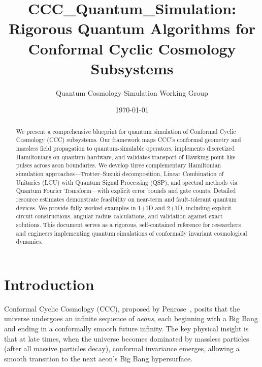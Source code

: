 \documentclass[11pt,a4paper]{article}
\theoremstyle{plain}
\theoremstyle{definition}
\theoremstyle{remark}
\begin{document}
\title{\textbf{CCC\_Quantum\_Simulation:}\\
\Large Rigorous Quantum Algorithms for Conformal Cyclic Cosmology Subsystems}

\author{Quantum Cosmology Simulation Working Group}

\date{\today}

\maketitle

\begin{abstract}
We present a comprehensive blueprint for quantum simulation of Conformal Cyclic Cosmology (CCC) subsystems. Our framework maps CCC's conformal geometry and massless field propagation to quantum-simulable operators, implements discretized Hamiltonians on quantum hardware, and validates transport of Hawking-point-like pulses across aeon boundaries. We develop three complementary Hamiltonian simulation approaches---Trotter--Suzuki decomposition, Linear Combination of Unitaries (LCU) with Quantum Signal Processing (QSP), and spectral methods via Quantum Fourier Transform---with explicit error bounds and gate counts. Detailed resource estimates demonstrate feasibility on near-term and fault-tolerant quantum devices. We provide fully worked examples in 1+1D and 2+1D, including explicit circuit constructions, angular radius calculations, and validation against exact solutions. This document serves as a rigorous, self-contained reference for researchers and engineers implementing quantum simulations of conformally invariant cosmological dynamics.
\end{abstract}

\tableofcontents
\newpage

\section{Introduction}\label{sec:introduction}

Conformal Cyclic Cosmology (CCC), proposed by Penrose~\cite{penrose2010cycles}, posits that the universe undergoes an infinite sequence of \emph{aeons}, each beginning with a Big Bang and ending in a conformally smooth future infinity. The key physical insight is that at late times, when the universe becomes dominated by massless particles (after all massive particles decay), conformal invariance emerges, allowing a smooth transition to the next aeon's Big Bang hypersurface.
\end{document}
